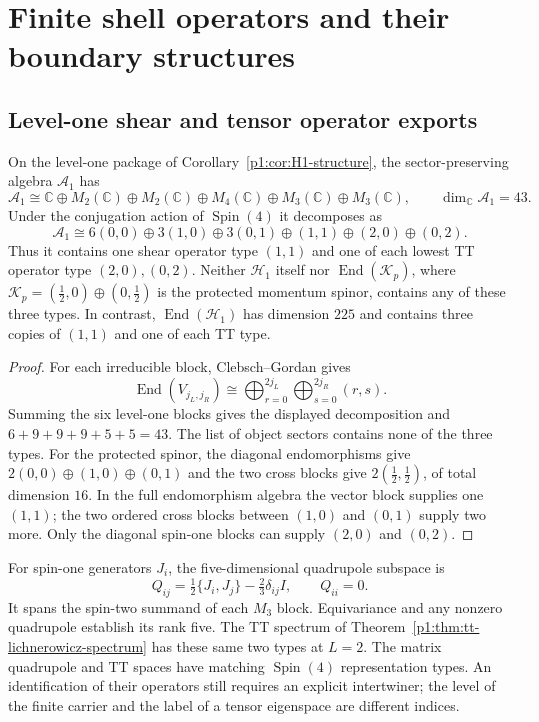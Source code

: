 \documentclass[11pt]{article}
\begin{document}
\section{Finite shell operators and their boundary structures}
\subsection{Level-one shear and tensor operator exports}
\label{p1:sec:level-one-tensor-operators}
\begin{corollary}
\label{p1:cor:level-one-shear-tt-operators}
On the level-one package of Corollary~\ref{p1:cor:H1-structure}, the
sector-preserving algebra $\mathcal A_1$ has
\[
 \mathcal A_1\cong\mathbb C\oplus M_2(\mathbb C)\oplus M_2(\mathbb C)
       \oplus M_4(\mathbb C)\oplus M_3(\mathbb C)\oplus M_3(\mathbb C),
 \qquad \dim_{\mathbb C}\mathcal A_1=43.
\]
Under the conjugation action of $\operatorname{Spin}(4)$ it decomposes as
\[
 \mathcal A_1\cong6(0,0)\oplus3(1,0)\oplus3(0,1)
                 \oplus(1,1)\oplus(2,0)\oplus(0,2).
\]
Thus it contains one shear operator type $(1,1)$ and one of each lowest
TT operator type $(2,0),(0,2)$. Neither $\mathcal H_1$ itself nor
$\operatorname{End}(\mathcal K_p)$, where
$\mathcal K_p=(\tfrac12,0)\oplus(0,\tfrac12)$ is the protected momentum
spinor, contains any of these three types. In contrast,
$\operatorname{End}(\mathcal H_1)$ has dimension $225$ and contains three
copies of $(1,1)$ and one of each TT type.
\end{corollary}
\begin{proof}
For each irreducible block, Clebsch--Gordan gives
\[
 \operatorname{End}(V_{j_L,j_R})
  \cong\bigoplus_{r=0}^{2j_L}\bigoplus_{s=0}^{2j_R}(r,s).
\]
Summing the six level-one blocks gives the displayed decomposition and
$6+9+9+9+5+5=43$. The list of object sectors contains none of the three
types. For the protected spinor, the diagonal endomorphisms give
$2(0,0)\oplus(1,0)\oplus(0,1)$ and the two cross blocks give
$2(\tfrac12,\tfrac12)$, of total dimension $16$.
In the full endomorphism algebra the vector block supplies one $(1,1)$;
the two ordered cross blocks between $(1,0)$ and $(0,1)$ supply two more.
Only the diagonal spin-one blocks can supply $(2,0)$ and $(0,2)$.
\end{proof}

For spin-one generators $J_i$, the five-dimensional quadrupole subspace is
\[
 Q_{ij}=\tfrac12\{J_i,J_j\}-\tfrac23\delta_{ij}I,
 \qquad Q_{ii}=0.
\]
It spans the spin-two summand of each $M_3$ block. Equivariance and any
nonzero quadrupole establish its rank five. The TT spectrum of
Theorem~\ref{p1:thm:tt-lichnerowicz-spectrum} has these same two types at
$L=2$. The matrix quadrupole and TT spaces have matching
\(\operatorname{Spin}(4)\) representation types.  An identification of
their operators still requires an explicit intertwiner; the level of the
finite carrier and the label of a tensor eigenspace are different indices.
\end{document}
